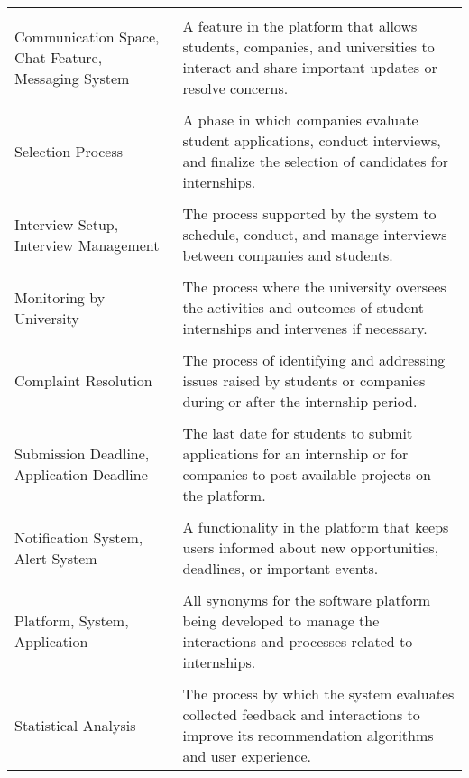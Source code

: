 \begin{longtable}{p{}p{}}
    \vspace{0.5em}\\
    Communication Space, Chat Feature, Messaging System & A feature in the platform that allows students, companies, and universities to interact and share important updates or resolve concerns. \\
    \vspace{0.5em}\\
    Selection Process & A phase in which companies evaluate student applications, conduct interviews, and finalize the selection of candidates for internships. \\
    \vspace{0.5em}\\
    Interview Setup, Interview Management & The process supported by the system to schedule, conduct, and manage interviews between companies and students. \\
    \vspace{0.5em}\\
    Monitoring by University & The process where the university oversees the activities and outcomes of student internships and intervenes if necessary. \\
    \vspace{0.5em}\\
    Complaint Resolution & The process of identifying and addressing issues raised by students or companies during or after the internship period. \\
    \vspace{0.5em}\\
    Submission Deadline, Application Deadline & The last date for students to submit applications for an internship or for companies to post available projects on the platform. \\
    \vspace{0.5em}\\
    Notification System, Alert System & A functionality in the platform that keeps users informed about new opportunities, deadlines, or important events. \\
    \vspace{0.5em}\\
    Platform, System, Application & All synonyms for the software platform being developed to manage the interactions and processes related to internships. \\
    \vspace{0.5em}\\
    Statistical Analysis & The process by which the system evaluates collected feedback and interactions to improve its recommendation algorithms and user experience. \\

\end{longtable}

        


